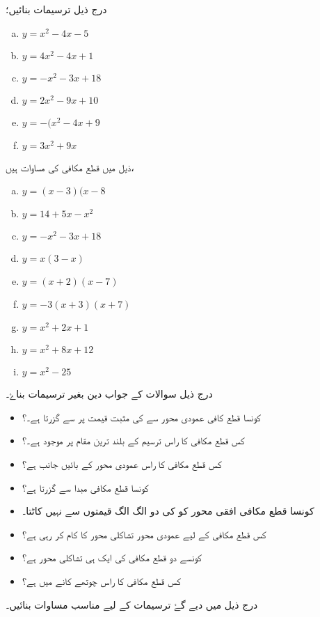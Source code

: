 درج ذیل ترسیمات بنائیں؛
\begin{multicols}{2}
\begin{enumerate}[a.]
\item \( y=x^{2}-4x-5 \)
\item \( y=4x^{2}-4x+1 \)
\item \( y=-x^{2}-3x+18 \)
\item \( y=2x^{2}-9x+10 \)
\item \(y=-(x^{2}-4x+9  \)
\item \( y=3x^{2}+9x\)
\end{enumerate}
\end{multicols}
ذیل میں  قطع مکافی کی مساوات ہیں،
\begin{multicols}{3}
\begin{enumerate}[a.]
\item \(  y=(x-3)(x-8\)
\item \(y=14+5x-x^{2}  \)
\item \(y=-x^{2}-3x+18  \)
\item \( y=x(3-x) \)
\item \(y=(x+2)(x-7)  \)
\item \(y=-3(x+3)(x+7)  \)
\item \( y=x^{2}+2x+1 \)
\item \(y=x^{2}+8x+12  \)
\item \( y=x^{2}-25 \)
\end{enumerate}
\end{multicols}
درج ذیل سوالات کے جواب دین بغیر ترسیمات بناۓ۔
\begin{itemize} 
\item  
کونسا قطع کافی عمودی محور سے  کی مثبت قیمت پر سے گزرتا ہے۔؟
\item  
کس قطع مکافی کا راس ترسیم کے بلند ترین مقام پر موجود ہے۔؟
\item  
کس قطع مکافی کا راس عمودی محور کے بائیں جانب ہے؟
\item  
کونسا قطع مکافی مبدا سے گزرتا ہے؟
\item  
کونسا قطع مکافی افقی محور کو  کی دو الگ الگ قیمتوں سے نہیں کاٹتا۔
\item  
کس قطع مکافی کے لیے عمودی محور تشاکلی محور کا کام کر رہی ہے؟
\item  
کونسے دو قطع مکافی کی ایک ہی تشاکلی محور ہے؟
\item
کس قطع مکافی کا راس چوتھے کانے  میں ہے؟
\end{itemize}
 درج ذیل میں دیے گۓ  ترسیمات کے لیے مناسب مساوات بنائیں۔
 

